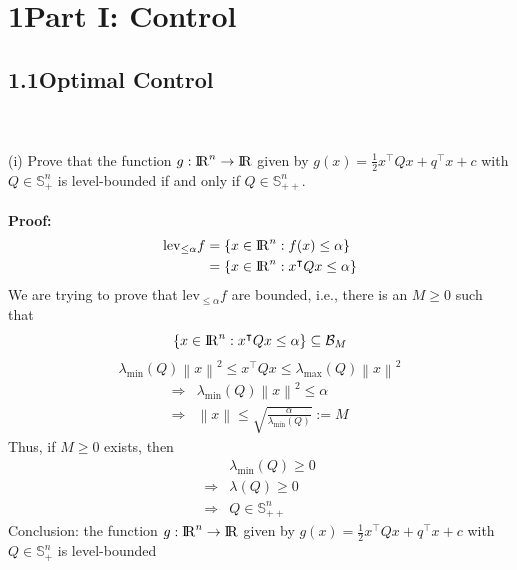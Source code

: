 \documentclass[a4paper,11pt,reqno]{amsart}
\newcommand{\R}{{\rm I\!R}}
\newcommand{\tran}{\intercal}
\begin{document}
\section*{\Large\textbf{1\quad Part I: Control}}


\subsection*{1.1\quad Optimal Control}\label{sec:q1}
\
\\ \\
(i) Prove that the function $g:\R^n\to \R$ given by $g(x) = \frac{1}{2}x^{\tran}Qx+q^{\tran}x+c$ with $Q\in \mathbb{S}^n_+$ is level-bounded
if and only if $Q\in \mathbb{S}^n_{++}$.
\\ \\
\textbf{Proof:}
\begin{align}
    \mathrm{lev}_{\leq \alpha}f&=\{x\in\R^n:f(x)\leq\alpha\}\notag\\
    &=\{x\in\R^n:x^{\tran}Qx\leq\alpha\}
\end{align}
We are trying to prove that $\mathrm{lev}_{\leq \alpha}f$ are bounded, i.e., there is an $M\geq 0$ such that
\begin{equation}
    \{x\in\R^n:x^{\tran}Qx\leq\alpha\}\subseteq \mathcal{B}_M
\end{equation}
\begin{equation}
    \lambda_{\mathrm{min}}(Q)\left\lVert x\right\rVert ^2\leq x^{\tran}Qx\leq \lambda_{\mathrm{max}}(Q)\left\lVert x\right\rVert ^2
\end{equation}
\begin{align}
    \Longrightarrow &\lambda_{\mathrm{min}}(Q)\left\lVert x\right\rVert ^2\leq \alpha\\
    \Longrightarrow &\left\lVert x\right\rVert \leq \sqrt{\frac{\alpha}{\lambda_{\mathrm{min}}(Q)}}:=M
\end{align}
Thus, if $M\geq 0$ exists, then
\begin{align}
    &\lambda_{\mathrm{min}}(Q)\geq 0\\
    \Longrightarrow&\lambda(Q)\geq 0\\
    \Longrightarrow &Q\in \mathbb{S}^n_{++}
\end{align}
Conclusion: the function $g:\R^n\to \R$ given by $g(x) = \frac{1}{2}x^{\tran}Qx+q^{\tran}x+c$ with $Q\in \mathbb{S}^n_+$ is level-bounded
\end{document}

